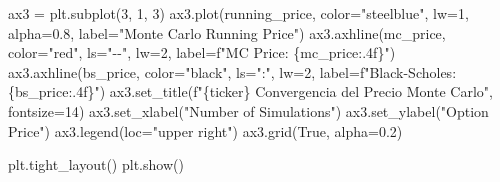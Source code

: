 \documentclass[
  11pt,
]{article}
\newenvironment{Shaded}{}{}
\newcommand{\DecValTok}[1]{\textcolor[rgb]{0.25,0.63,0.44}{#1}}
\newcommand{\FloatTok}[1]{\textcolor[rgb]{0.25,0.63,0.44}{#1}}
\newcommand{\NormalTok}[1]{#1}
\newcommand{\OperatorTok}[1]{\textcolor[rgb]{0.40,0.40,0.40}{#1}}
\newcommand{\SpecialCharTok}[1]{\textcolor[rgb]{0.25,0.44,0.63}{#1}}
\newcommand{\SpecialStringTok}[1]{\textcolor[rgb]{0.73,0.40,0.53}{#1}}
\newcommand{\StringTok}[1]{\textcolor[rgb]{0.25,0.44,0.63}{#1}}
\newcommand{\VariableTok}[1]{\textcolor[rgb]{0.10,0.09,0.49}{#1}}
\begin{document}
\begin{Shaded}
\begin{Highlighting}[]
\NormalTok{ax3 }\OperatorTok{=}\NormalTok{ plt.subplot(}\DecValTok{3}\NormalTok{, }\DecValTok{1}\NormalTok{, }\DecValTok{3}\NormalTok{)}
\NormalTok{ax3.plot(running\_price, color}\OperatorTok{=}\StringTok{"steelblue"}\NormalTok{, lw}\OperatorTok{=}\DecValTok{1}\NormalTok{, alpha}\OperatorTok{=}\FloatTok{0.8}\NormalTok{, label}\OperatorTok{=}\StringTok{"Monte Carlo Running Price"}\NormalTok{)}
\NormalTok{ax3.axhline(mc\_price, color}\OperatorTok{=}\StringTok{"red"}\NormalTok{, ls}\OperatorTok{=}\StringTok{"{-}{-}"}\NormalTok{, lw}\OperatorTok{=}\DecValTok{2}\NormalTok{, label}\OperatorTok{=}\SpecialStringTok{f"MC Price: }\SpecialCharTok{\{}\NormalTok{mc\_price}\SpecialCharTok{:.4f\}}\SpecialStringTok{"}\NormalTok{)}
\NormalTok{ax3.axhline(bs\_price, color}\OperatorTok{=}\StringTok{"black"}\NormalTok{, ls}\OperatorTok{=}\StringTok{":"}\NormalTok{, lw}\OperatorTok{=}\DecValTok{2}\NormalTok{, label}\OperatorTok{=}\SpecialStringTok{f"Black{-}Scholes: }\SpecialCharTok{\{}\NormalTok{bs\_price}\SpecialCharTok{:.4f\}}\SpecialStringTok{"}\NormalTok{)}
\NormalTok{ax3.set\_title(}\SpecialStringTok{f"}\SpecialCharTok{\{}\NormalTok{ticker}\SpecialCharTok{\}}\SpecialStringTok{ Convergencia del Precio Monte Carlo"}\NormalTok{, fontsize}\OperatorTok{=}\DecValTok{14}\NormalTok{)}
\NormalTok{ax3.set\_xlabel(}\StringTok{"Number of Simulations"}\NormalTok{)}
\NormalTok{ax3.set\_ylabel(}\StringTok{"Option Price"}\NormalTok{)}
\NormalTok{ax3.legend(loc}\OperatorTok{=}\StringTok{"upper right"}\NormalTok{)}
\NormalTok{ax3.grid(}\VariableTok{True}\NormalTok{, alpha}\OperatorTok{=}\FloatTok{0.2}\NormalTok{)}

\NormalTok{plt.tight\_layout()}
\NormalTok{plt.show()}


\end{Highlighting}
\end{Shaded}
\end{document}
